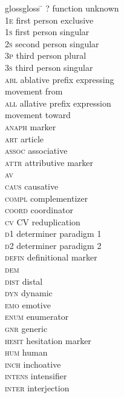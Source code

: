 \documentclass[output=paper
,modfonts
,nonflat]{langsci/langscibook}
\begin{document}
\begin{multicols}{2}
	\begin{tabbing}
		glossgloss \= \kill
		\textsc{?} \> function unknown\\
		\textsc{1e} \> first person exclusive\\
		\textsc{1s} \> first person singular\\
		\textsc{2s} \> second person singular\\
		\textsc{3p} \> third person plural\\
		\textsc{3s} \> third person singular\\
		\textsc{abl} \> ablative prefix expressing\\ \> movement from\\
		\textsc{all} \> allative prefix expression\\ \> movement toward\\
		\textsc{anaph} \>  marker\\
		\textsc{art} \> article\\
		\textsc{assoc} \> associative\\
		\textsc{attr} \> attributive marker\\
		\textsc{av} \> \\
		\textsc{caus} \> causative\\
		\textsc{compl} \> complementizer\\
		\textsc{coord} \> coordinator\\
		\textsc{cv} \> CV reduplication\\
		\textsc{d1} \> determiner paradigm 1\\
		\textsc{d2} \> determiner paradigm 2\\
		\textsc{defin} \> definitional marker\\
		\textsc{dem} \> \\
		\textsc{dist} \> distal\\
		\textsc{dyn} \> dynamic\\
		\textsc{emo} \> emotive\\
		\textsc{enum} \> enumerator\\
		\textsc{gnr} \> generic\\
		\textsc{hesit} \> hesitation marker\\
		\textsc{hum} \> human\\
		\textsc{inch} \> inchoative\\
		\textsc{intens} \> intensifier\\
		\textsc{inter} \> interjection\\

\end{tabbing}
\end{multicols}
\end{document}

